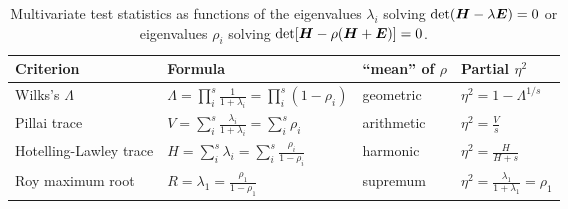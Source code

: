 
\begin{table}[htb]
\renewcommand{\arraystretch}{1.6}
\caption{Multivariate test statistics as functions of the eigenvalues $\lambda_i$ solving $\mathrm{det} (\bm{H} - \lambda \bm{E})=0$
or eigenvalues $\rho_i$ solving  $\mathrm{det} [\bm{H} - \rho (\bm{H}+\bm{E})]=0$.
}\label{tab:criteria}
\begin{center}
\begin{tabular}{|l|l|l|l|}
  \hline
  Criterion & Formula & ``mean'' of $\rho$ & Partial $\eta^2$   \\
  \hline
  Wilks's $\Lambda$ & $\Lambda = \prod^s_i \frac{1}{1+\lambda_i} = \prod^s_i (1-\rho_i)$ & geometric & $\eta^2 = 1-\Lambda^{1/s}$   \\
  Pillai trace & $V = \sum^s_i \frac{\lambda_i}{1+\lambda_i} = \sum^s_i \rho_i$ & arithmetic & $\eta^2 = \frac{V}{s} $   \\
  Hotelling-Lawley trace & $H = \sum^s_i \lambda_i = \sum^s_i \frac{\rho_i}{1-\rho_i} $ & harmonic & $\eta^2 = \frac{H}{H+s}$   \\
  Roy maximum root & $R = \lambda_1 = \frac{\rho_1}{1-\rho_1}$  & supremum & $ \eta^2 = \frac{\lambda_1}{1+\lambda_1} = \rho_1$   \\
  \hline
\end{tabular}
\end{center}
\end{table}
%
